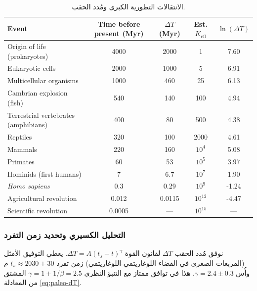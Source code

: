 \documentclass[11pt,a4paper]{article}
\begin{document}
	\begin{table}[htbp]
		\begin{otherlanguage}{english}
			\centering
			\caption{Major evolutionary transitions and epoch durations.}
			\label{tab:evolutionary-epochs}
			\footnotesize \begin{tabular}{l c c c c}
				\toprule
				\textbf{Event} & \textbf{Time before present (Myr)} & \(\Delta T\) (Myr) & Est. \(K_{\mathrm{eff}}\) & \(\ln(\Delta T)\) \\
				\midrule
				Origin of life (prokaryotes) & 4000 & 2000 & 1 & 7.60 \\
				Eukaryotic cells & 2000 & 1000 & 5 & 6.91 \\
				Multicellular organisms & 1000 & 460 & 25 & 6.13 \\
				Cambrian explosion (fish) & 540 & 140 & 100 & 4.94 \\
				Terrestrial vertebrates (amphibians) & 400 & 80 & 500 & 4.38 \\
				Reptiles & 320 & 100 & 2000 & 4.61 \\
				Mammals & 220 & 160 & \(10^4\) & 5.08 \\
				Primates & 60 & 53 & \(10^5\) & 3.97 \\
				Hominids (first humans) & 7 & 6.7 & \(10^7\) & 1.90 \\
				\emph{Homo sapiens} & 0.3 & 0.29 & \(10^9\) & -1.24 \\
				Agricultural revolution & 0.012 & 0.0115 & \(10^{12}\) & -4.47 \\
				Scientific revolution & 0.0005 & --- & \(10^{15}\) & --- \\
				\bottomrule
			\end{tabular}
		\end{otherlanguage}
		\caption{الانتقالات التطورية الكبرى ومُدد الحقب.}
	\end{table}
	
	\subsubsection{التحليل الكسيري وتحديد زمن التفرد}
	
	نوفق مُدد الحقب \(\Delta T\) لقانون القوة \(\Delta T = A (t_s - t)^{\gamma}\). يعطي التوفيق الأمثل (المربعات الصغرى في الفضاء اللوغاريتمي-اللوغاريتمي) زمن تفرد \(t_s \approx 2030 \pm 30\) م وأُس \(\gamma = 2.4 \pm 0.3\). هذا في توافق ممتاز مع التنبؤ النظري \(\gamma = 1 + 1/\beta = 2.5\) المشتق من المعادلة \eqref{eq:paleo-dT}.
	
\end{document}
